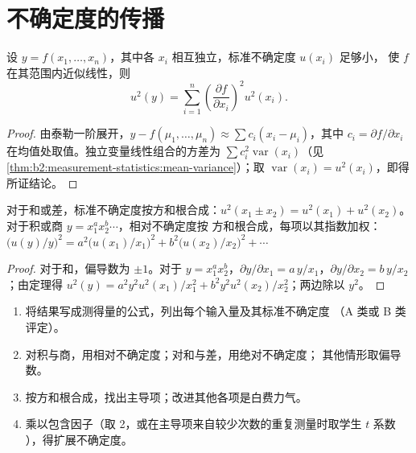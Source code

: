 \section{不确定度的传播}

\begin{theorem}[不确定度传播定律]\label{thm:b2:measurement-statistics:propagation}
设 $y = f(x_1, \dots, x_n)$，其中各 $x_i$ 相互独立，标准不确定度 $u(x_i)$ 足够小，
使 $f$ 在其范围内近似线性，则
\begin{equation*}
u^2(y) = \sum_{i=1}^{n}\left(\frac{\partial f}{\partial x_i}\right)^2 u^2(x_i).
\end{equation*}
\end{theorem}

\begin{proof}
由泰勒一阶展开，$y - f(\mu_1, \dots, \mu_n) \approx \sum c_i(x_i - \mu_i)$，其中 $c_i = \partial
f/\partial x_i$ 在均值处取值。独立变量线性组合的方差为
$\sum c_i^2\operatorname{var}(x_i)$（见\cref{thm:b2:measurement-statistics:mean-variance}）；取
$\operatorname{var}(x_i) = u^2(x_i)$，即得所证结论。
\end{proof}

\begin{corollary}[和与积]\label{cor:b2:measurement-statistics:products}
对于和或差，标准不确定度按方和根合成：$u^2(x_1 \pm x_2) = u^2(x_1) +
u^2(x_2)$。对于积或商 $y = x_1^{a}x_2^{b}\cdots$，相对不确定度按
方和根合成，每项以其指数加权：$\bigl(u(y)/y\bigr)^2 = a^2\bigl(u(x_1)/x_1\bigr)^2 +
b^2\bigl(u(x_2)/x_2\bigr)^2 + \cdots$
\end{corollary}

\begin{proof}
对于和，偏导数为 $\pm1$。对于 $y = x_1^ax_2^b$，$\partial y/\partial x_1 =
a\,y/x_1$，$\partial y/\partial x_2 = b\,y/x_2$；由定理得 $u^2(y) = a^2y^2u^2(x_1)/x_1^2 +
b^2y^2u^2(x_2)/x_2^2$；两边除以 $y^2$。
\end{proof}

\begin{method}[传播不确定度]\label{met:b2:measurement-statistics:propagate}
\begin{enumerate}
  \item 将结果写成测得量的公式，列出每个输入量及其标准不确定度
        （A 类或 B 类评定）。
  \item 对积与商，用相对不确定度；对和与差，用绝对不确定度；
        其他情形取偏导数。
  \item 按方和根合成，找出主导项；改进其他各项是白费力气。
  \item 乘以包含因子（取 2，或在主导项来自较少次数的重复测量时取学生 $t$ 系数
        ），得扩展不确定度。
\end{enumerate}
\end{method}

